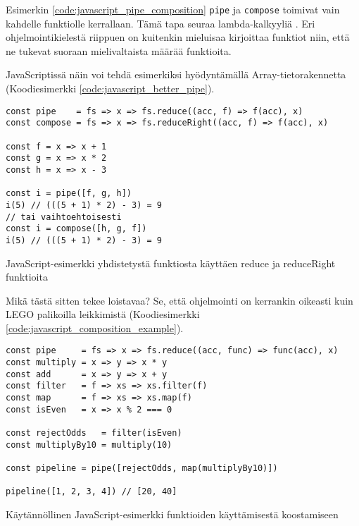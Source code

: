 Esimerkin \ref{code:javascript_pipe_composition} \texttt{pipe} ja \texttt{compose} toimivat vain kahdelle funktiolle kerrallaan. Tämä tapa seuraa lambda-kalkyyliä \cite{computerphile_lambda}. Eri ohjelmointikielestä riippuen on kuitenkin mieluisaa kirjoittaa funktiot niin, että ne tukevat suoraan mielivaltaista määrää funktioita.

JavaScriptissä näin voi tehdä esimerkiksi hyödyntämällä Array-tietorakennetta (Koodiesimerkki \ref{code:javascript_better_pipe}).

\begin{code}
    \begin{verbatim}
const pipe    = fs => x => fs.reduce((acc, f) => f(acc), x)
const compose = fs => x => fs.reduceRight((acc, f) => f(acc), x)

const f = x => x + 1
const g = x => x * 2
const h = x => x - 3

const i = pipe([f, g, h])
i(5) // (((5 + 1) * 2) - 3) = 9
// tai vaihtoehtoisesti 
const i = compose([h, g, f])
i(5) // (((5 + 1) * 2) - 3) = 9

\end{verbatim}
    \caption{JavaScript-esimerkki yhdistetystä funktiosta käyttäen reduce ja reduceRight funktioita}
    \label{code:javascript_better_pipe}
\end{code}

Mikä tästä sitten tekee loistavaa? Se, että ohjelmointi on kerrankin oikeasti kuin LEGO palikoilla leikkimistä (Koodiesimerkki \ref{code:javascript_composition_example}).

\begin{code}
    \begin{verbatim}
const pipe     = fs => x => fs.reduce((acc, func) => func(acc), x)
const multiply = x => y => x * y
const add      = x => y => x + y
const filter   = f => xs => xs.filter(f)
const map      = f => xs => xs.map(f)
const isEven   = x => x % 2 === 0

const rejectOdds   = filter(isEven)
const multiplyBy10 = multiply(10)

const pipeline = pipe([rejectOdds, map(multiplyBy10)])

pipeline([1, 2, 3, 4]) // [20, 40]

\end{verbatim}
    \caption{Käytännöllinen JavaScript-esimerkki funktioiden käyttämisestä koostamiseen}
    \label{code:javascript_composition_example}
\end{code}

